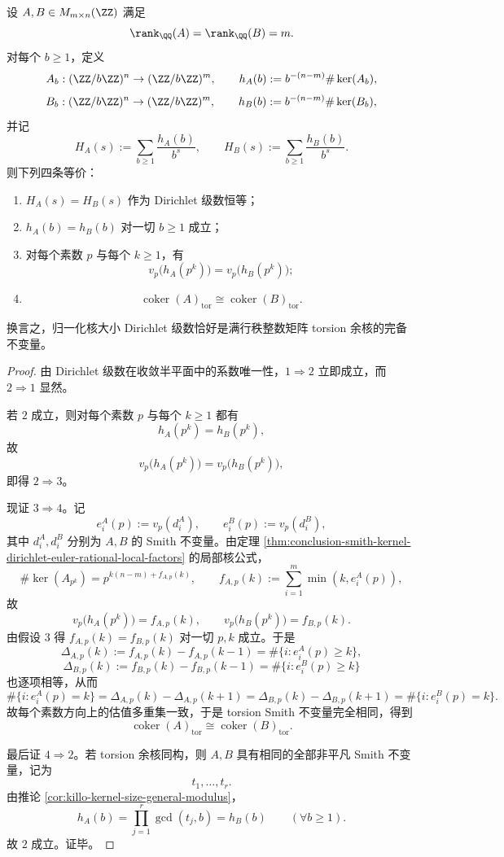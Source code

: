 \begin{theorem}\label{thm:conclusion-smith-normalized-kernel-dirichlet-torsion-equivalence}
设 \(A,B\in M_{m\times n}(\ZZ)\) 满足
\[
\rank_{\QQ}(A)=\rank_{\QQ}(B)=m.
\]
对每个 \(b\ge 1\)，定义
\[
A_b:(\ZZ/b\ZZ)^n\to(\ZZ/b\ZZ)^m,
\qquad
h_A(b):=b^{-(n-m)}\#\ker(A_b),
\]
\[
B_b:(\ZZ/b\ZZ)^n\to(\ZZ/b\ZZ)^m,
\qquad
h_B(b):=b^{-(n-m)}\#\ker(B_b),
\]
并记
\[
H_A(s):=\sum_{b\ge 1}\frac{h_A(b)}{b^s},
\qquad
H_B(s):=\sum_{b\ge 1}\frac{h_B(b)}{b^s}.
\]
则下列四条等价：
\begin{enumerate}
  \item \(H_A(s)=H_B(s)\) 作为 Dirichlet 级数恒等；
  \item \(h_A(b)=h_B(b)\) 对一切 \(b\ge 1\) 成立；
  \item 对每个素数 \(p\) 与每个 \(k\ge 1\)，有
  \[
  v_p\!\bigl(h_A(p^k)\bigr)=v_p\!\bigl(h_B(p^k)\bigr);
  \]
  \item
  \[
  \operatorname{coker}(A)_{\mathrm{tor}}
  \cong
  \operatorname{coker}(B)_{\mathrm{tor}}.
  \]
\end{enumerate}
换言之，归一化核大小 Dirichlet 级数恰好是满行秩整数矩阵 torsion 余核的完备不变量。
\end{theorem}
\begin{proof}
由 Dirichlet 级数在收敛半平面中的系数唯一性，\(1\Rightarrow 2\) 立即成立，而 \(2\Rightarrow 1\) 显然。

若 \(2\) 成立，则对每个素数 \(p\) 与每个 \(k\ge 1\) 都有
\[
h_A(p^k)=h_B(p^k),
\]
故
\[
v_p\!\bigl(h_A(p^k)\bigr)=v_p\!\bigl(h_B(p^k)\bigr),
\]
即得 \(2\Rightarrow 3\)。

现证 \(3\Rightarrow 4\)。记
\[
e_i^A(p):=v_p(d_i^A),
\qquad
e_i^B(p):=v_p(d_i^B),
\]
其中 \(d_i^A,d_i^B\) 分别为 \(A,B\) 的 Smith 不变量。由定理 \ref{thm:conclusion-smith-kernel-dirichlet-euler-rational-local-factors} 的局部核公式，
\[
\#\ker(A_{p^k})=p^{k(n-m)+f_{A,p}(k)},
\qquad
f_{A,p}(k):=\sum_{i=1}^{m}\min(k,e_i^A(p)),
\]
故
\[
v_p\!\bigl(h_A(p^k)\bigr)=f_{A,p}(k),
\qquad
v_p\!\bigl(h_B(p^k)\bigr)=f_{B,p}(k).
\]
由假设 \(3\) 得 \(f_{A,p}(k)=f_{B,p}(k)\) 对一切 \(p,k\) 成立。于是
\[
\Delta_{A,p}(k):=f_{A,p}(k)-f_{A,p}(k-1)=\#\{i:e_i^A(p)\ge k\},
\]
\[
\Delta_{B,p}(k):=f_{B,p}(k)-f_{B,p}(k-1)=\#\{i:e_i^B(p)\ge k\}
\]
也逐项相等，从而
\[
\#\{i:e_i^A(p)=k\}
=
\Delta_{A,p}(k)-\Delta_{A,p}(k+1)
=
\Delta_{B,p}(k)-\Delta_{B,p}(k+1)
=
\#\{i:e_i^B(p)=k\}.
\]
故每个素数方向上的估值多重集一致，于是 torsion Smith 不变量完全相同，得到
\[
\operatorname{coker}(A)_{\mathrm{tor}}
\cong
\operatorname{coker}(B)_{\mathrm{tor}}.
\]

最后证 \(4\Rightarrow 2\)。若 torsion 余核同构，则 \(A,B\) 具有相同的全部非平凡 Smith 不变量，记为
\[
t_1,\dots,t_r.
\]
由推论 \ref{cor:killo-kernel-size-general-modulus}，
\[
h_A(b)=\prod_{j=1}^{r}\gcd(t_j,b)=h_B(b)
\qquad(\forall b\ge 1).
\]
故 \(2\) 成立。证毕。
\end{proof}

